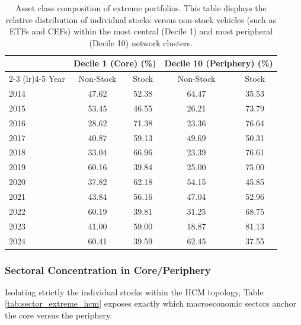 \documentclass[fleqn]{rbfin}
\begin{document}
\begin{table}[!htbp]
    \begin{subtable}{\textwidth}
        \centering
        \begin{tabular}{lcccc}
        \toprule
        & \multicolumn{2}{c}{Decile 1 (Core) (\%)} & \multicolumn{2}{c}{Decile 10 (Periphery) (\%)} \\
        \cmidrule(lr){2-3} \cmidrule(lr){4-5}
        Year & Non-Stock & Stock & Non-Stock & Stock \\
        \midrule
        2014 & 47.62 & 52.38 & 64.47 & 35.53 \\
        2015 & 53.45 & 46.55 & 26.21 & 73.79 \\
        2016 & 28.62 & 71.38 & 23.36 & 76.64 \\
        2017 & 40.87 & 59.13 & 49.69 & 50.31 \\
        2018 & 33.04 & 66.96 & 23.39 & 76.61 \\
        2019 & 60.16 & 39.84 & 25.00 & 75.00 \\
        2020 & 37.82 & 62.18 & 54.15 & 45.85 \\
        2021 & 43.84 & 56.16 & 47.04 & 52.96 \\
        2022 & 60.19 & 39.81 & 31.25 & 68.75 \\
        2023 & 41.00 & 59.00 & 18.87 & 81.13 \\
        2024 & 60.41 & 39.59 & 62.45 & 37.55 \\
        \bottomrule
        \end{tabular}
        \caption{Pozzi Topology}
    \end{subtable}
    
    \vspace{0.2em}
    \caption{Asset class composition of extreme portfolios. This table displays the relative distribution of individual stocks versus non-stock vehicles (such as ETFs and CEFs) within the most central (Decile 1) and most peripheral (Decile 10) network clusters.}
    \label{tab:asset_class_extreme}
\end{table}

\subsubsection{Sectoral Concentration in Core/Periphery}

\noindent Isolating strictly the individual stocks within the HCM topology, Table \ref{tab:sector_extreme_hcm} exposes exactly which macroeconomic sectors anchor the core versus the periphery. 
\end{document}

